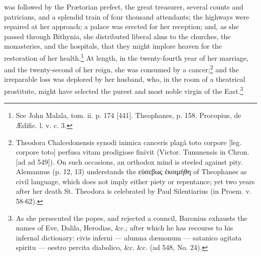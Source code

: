 was followed by the Prætorian prefect, the great treasurer, several counts and patricians, and a splendid train of four thousand attendants; the highways were repaired at her approach; a palace was erected for her reception; and, as she passed through Bithynia, she distributed liberal alms to the churches, the monasteries, and the hospitals, that they might implore heaven for the restoration of her health.\footnote{See John Malala, tom. ii. p. 174 [441]. Theophanes, p. 158. Procopius, de Ædific. l. v. c. 3.} At length, in the twenty-fourth year of her marriage, and the twenty-second of her reign, she was consumed by a cancer;\footnote{Theodora Chalcedonensis synodi inimica canceris plagâ toto corpore [leg. corpore toto] perfusa vitam prodigiose finivit (Victor. Tununensis in Chron. [ad ad 549]). On such occasions, an orthodox mind is steeled against pity. Alemannus (p. 12, 13) understands the \textgreek{ε\texthebrew{ὐ}σεβως \texthebrew{ἐ}κοιμήθη} of Theophanes as civil language, which does not imply either piety or repentance; yet two years after her death St. Theodora is celebrated by Paul Silentiarius (in Proem. v. 58-62).} and the irreparable loss was deplored by her husband, who, in the room of a theatrical prostitute, might have selected the purest and most noble virgin of the East.\footnote{As she persecuted the popes, and rejected a council, Baronius exhausts the names of Eve, Dalila, Herodias, \&c.; after which he has recourse to his infernal dictionary: civis inferni \texthebrew{—} alumna dæmonum \texthebrew{—} satanico agitata spiritu \texthebrew{—} oestro percita diabolico, \&c. \&c. (ad 548, No. 24).}

